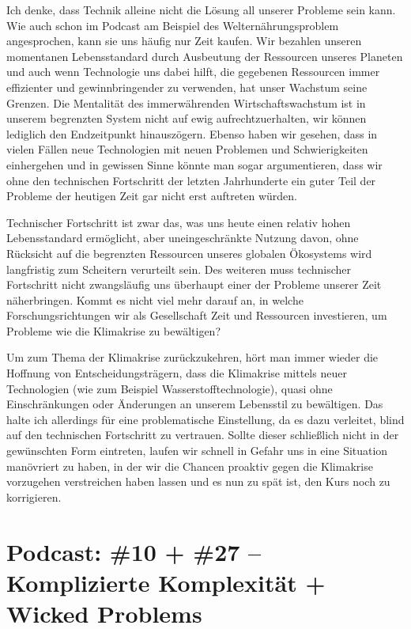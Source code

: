 \documentclass[twoside, a4paper, DIV=11, open=any, bibliography=totoc]{scrbook}
\begin{document}
Ich denke, dass Technik alleine nicht die Lösung all unserer Probleme sein kann.
Wie auch schon im Podcast am Beispiel des Welternährungsproblem angesprochen,
kann sie uns häufig nur Zeit kaufen. Wir bezahlen unseren momentanen Lebensstandard
durch Ausbeutung der Ressourcen unseres Planeten und auch wenn Technologie uns dabei
hilft, die gegebenen Ressourcen immer effizienter und gewinnbringender zu verwenden,
hat unser Wachstum seine Grenzen.
Die Mentalität des immerwährenden Wirtschaftswachstum
ist in unserem begrenzten System nicht auf ewig aufrechtzuerhalten, wir können
lediglich den Endzeitpunkt hinauszögern. Ebenso haben wir gesehen, dass in vielen Fällen
neue Technologien mit neuen Problemen und Schwierigkeiten einhergehen und in gewissen
Sinne könnte man sogar argumentieren, dass wir ohne den technischen Fortschritt
der letzten Jahrhunderte ein guter Teil der Probleme der heutigen Zeit gar nicht
erst auftreten würden.


Technischer Fortschritt ist zwar das, was uns heute einen relativ hohen Lebensstandard ermöglicht,
aber uneingeschränkte Nutzung davon, ohne Rücksicht auf die begrenzten Ressourcen
unseres globalen Ökosystems wird langfristig zum Scheitern verurteilt sein.
Des weiteren muss technischer Fortschritt nicht zwangsläufig uns überhaupt einer
 der Probleme unserer Zeit näherbringen. Kommt es nicht viel mehr
darauf an, in welche Forschungsrichtungen wir als Gesellschaft Zeit und Ressourcen
investieren, um Probleme wie die Klimakrise zu bewältigen?


Um zum Thema der Klimakrise zurückzukehren, hört man immer wieder die Hoffnung
von Entscheidungsträgern, dass die Klimakrise mittels neuer Technologien
(wie zum Beispiel Wasserstofftechnologie), quasi ohne
Einschränkungen oder Änderungen an unserem Lebensstil zu bewältigen.
Das halte ich allerdings für eine problematische Einstellung, da es dazu
verleitet, blind auf den technischen Fortschritt zu vertrauen.
Sollte dieser schließlich nicht in der gewünschten Form eintreten, laufen wir schnell
in Gefahr uns in eine Situation manövriert zu haben, in der wir die Chancen proaktiv
gegen die Klimakrise vorzugehen verstreichen haben lassen und es nun zu spät ist,
den Kurs noch zu korrigieren.


\section{Podcast: \#10 + \#27 -- Komplizierte Komplexität + Wicked Problems}
\end{document}
